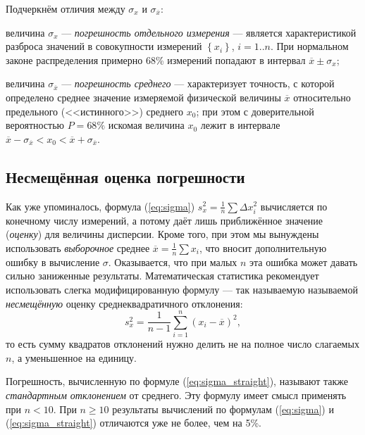 \documentclass[10pt]{article}
\begin{document}
Подчеркнём отличия между $\sigma_{x}$ и $\sigma_{\overline{x}}$:

величина $\sigma_{x}$ --- \emph{погрешность отдельного
измерения} --- является характеристикой разброса значений
в совокупности измерений $\left\{ x_{i}\right\} $, $i=1..n$. При
нормальном законе распределения примерно 68\% измерений попадают в
интервал $\overline{x}\pm\sigma_{x}$;

величина $\sigma_{\overline{x}}$ --- \emph{погрешность
среднего} --- характеризует точность, с которой определено
среднее значение измеряемой физической величины $\overline{x}$ относительно
предельного (<<истинного>>) среднего $x_{0}$;
при этом с доверительной вероятностью $P=68\%$ искомая величина $x_{0}$
лежит в интервале $\overline{x}-\sigma_{\overline{x}}<x_{0}<\overline{x}+\sigma_{\overline{x}}$.

\subsection{Несмещённая оценка погрешности\label{subsec:nesmesch}}


Как уже упоминалось, формула (\ref{eq:sigma}) $s_{x}^{2}=\frac{1}{n}\sum\Delta x_{i}^{2}$
вычисляется по конечному числу измерений, а потому даёт лишь приближённое
значение (\emph{оценку}) для величины дисперсии. Кроме того, при этом
мы вынуждены использовать \emph{выборочное} среднее $\overline{x}=\frac{1}{n}\sum x_{i}$,
что вносит дополнительную ошибку в вычисление $\sigma$. Оказывается,
что при малых $n$ эта ошибка может давать сильно заниженные результаты.
Математическая статистика рекомендует использовать слегка модифицированную
формулу --- так называемую называемой \emph{несмещённую}
оценку среднеквадратичного отклонения:
\begin{equation}
\boxed{s_{x}^{2}=\frac{1}{n-1}\sum\limits _{i=1}^{n}\left(x_{i}-\overline{x}\right)^{2}},\label{eq:sigma_straight}
\end{equation}
то есть сумму квадратов отклонений нужно делить не на полное число
слагаемых $n$, а уменьшенное на единицу.

Погрешность, вычисленную по формуле (\ref{eq:sigma_straight}), называют
также \emph{стандартным отклонением} от среднего. Эту формулу имеет
смысл применять при $n<10$. При $n\ge10$ результаты вычислений по
формулам (\ref{eq:sigma}) и (\ref{eq:sigma_straight}) отличаются
уже не более, чем на 5\%.
\end{document}
